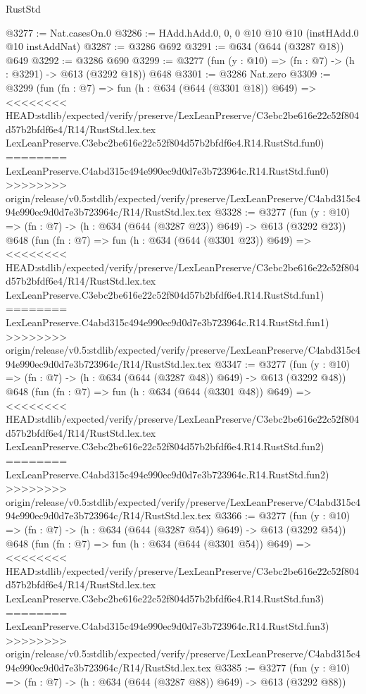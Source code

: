 \begin{lexlean}{RustStd}
\begin{coremodule}
{\begin{coremodule}
{{{{{{{{{{@3277 := Nat.casesOn.{0}
@3286 := HAdd.hAdd.{0, 0, 0} @10 @10 @10 (instHAdd.{0} @10 instAddNat)
@3287 := @3286 @692
@3291 := @634 (@644 (@3287 @18)) @649
@3292 := @3286 @690
@3299 := @3277 (fun (y : @10) => (fn : @7) -> (h : @3291) -> @613 (@3292 @18)) @648
@3301 := @3286 Nat.zero
@3309 := @3299
    (fun (fn : @7) =>
    fun (h : @634 (@644 (@3301 @18)) @649) =>
<<<<<<<< HEAD:stdlib/expected/verify/preserve/LexLeanPreserve/C3ebc2be616e22c52f804d57b2bfdf6e4/R14/RustStd.lex.tex
    LexLeanPreserve.C3ebc2be616e22c52f804d57b2bfdf6e4.R14.RustStd.fun0)
========
    LexLeanPreserve.C4abd315c494e990ec9d0d7e3b723964c.R14.RustStd.fun0)
>>>>>>>> origin/release/v0.5:stdlib/expected/verify/preserve/LexLeanPreserve/C4abd315c494e990ec9d0d7e3b723964c/R14/RustStd.lex.tex
@3328 := @3277
    (fun (y : @10) => (fn : @7) -> (h : @634 (@644 (@3287 @23)) @649) -> @613 (@3292 @23))
    @648
    (fun (fn : @7) =>
    fun (h : @634 (@644 (@3301 @23)) @649) =>
<<<<<<<< HEAD:stdlib/expected/verify/preserve/LexLeanPreserve/C3ebc2be616e22c52f804d57b2bfdf6e4/R14/RustStd.lex.tex
    LexLeanPreserve.C3ebc2be616e22c52f804d57b2bfdf6e4.R14.RustStd.fun1)
========
    LexLeanPreserve.C4abd315c494e990ec9d0d7e3b723964c.R14.RustStd.fun1)
>>>>>>>> origin/release/v0.5:stdlib/expected/verify/preserve/LexLeanPreserve/C4abd315c494e990ec9d0d7e3b723964c/R14/RustStd.lex.tex
@3347 := @3277
    (fun (y : @10) => (fn : @7) -> (h : @634 (@644 (@3287 @48)) @649) -> @613 (@3292 @48))
    @648
    (fun (fn : @7) =>
    fun (h : @634 (@644 (@3301 @48)) @649) =>
<<<<<<<< HEAD:stdlib/expected/verify/preserve/LexLeanPreserve/C3ebc2be616e22c52f804d57b2bfdf6e4/R14/RustStd.lex.tex
    LexLeanPreserve.C3ebc2be616e22c52f804d57b2bfdf6e4.R14.RustStd.fun2)
========
    LexLeanPreserve.C4abd315c494e990ec9d0d7e3b723964c.R14.RustStd.fun2)
>>>>>>>> origin/release/v0.5:stdlib/expected/verify/preserve/LexLeanPreserve/C4abd315c494e990ec9d0d7e3b723964c/R14/RustStd.lex.tex
@3366 := @3277
    (fun (y : @10) => (fn : @7) -> (h : @634 (@644 (@3287 @54)) @649) -> @613 (@3292 @54))
    @648
    (fun (fn : @7) =>
    fun (h : @634 (@644 (@3301 @54)) @649) =>
<<<<<<<< HEAD:stdlib/expected/verify/preserve/LexLeanPreserve/C3ebc2be616e22c52f804d57b2bfdf6e4/R14/RustStd.lex.tex
    LexLeanPreserve.C3ebc2be616e22c52f804d57b2bfdf6e4.R14.RustStd.fun3)
========
    LexLeanPreserve.C4abd315c494e990ec9d0d7e3b723964c.R14.RustStd.fun3)
>>>>>>>> origin/release/v0.5:stdlib/expected/verify/preserve/LexLeanPreserve/C4abd315c494e990ec9d0d7e3b723964c/R14/RustStd.lex.tex
@3385 := @3277
    (fun (y : @10) => (fn : @7) -> (h : @634 (@644 (@3287 @88)) @649) -> @613 (@3292 @88))
}}}}}}}}}}
\end{coremodule}}
\end{coremodule}
\end{lexlean}
